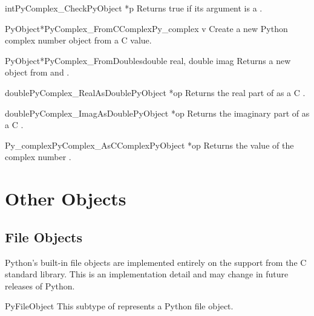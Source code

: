\documentclass{manual}
\begin{document}
\begin{cfuncdesc}{int}{PyComplex_Check}{PyObject *p}
Returns true if its argument is a .
\end{cfuncdesc}

\begin{cfuncdesc}{PyObject*}{PyComplex_FromCComplex}{Py_complex v}
Create a new Python complex number object from a C
 value.
\end{cfuncdesc}

\begin{cfuncdesc}{PyObject*}{PyComplex_FromDoubles}{double real, double imag}
Returns a new  object from  and .
\end{cfuncdesc}

\begin{cfuncdesc}{double}{PyComplex_RealAsDouble}{PyObject *op}
Returns the real part of  as a C .
\end{cfuncdesc}

\begin{cfuncdesc}{double}{PyComplex_ImagAsDouble}{PyObject *op}
Returns the imaginary part of  as a C .
\end{cfuncdesc}

\begin{cfuncdesc}{Py_complex}{PyComplex_AsCComplex}{PyObject *op}
Returns the  value of the complex number .
\end{cfuncdesc}



\section{Other Objects \label{otherObjects}}

\subsection{File Objects \label{fileObjects}}

Python's built-in file objects are implemented entirely on the
 support from the C standard library.  This is an
implementation detail and may change in future releases of Python.

\begin{ctypedesc}{PyFileObject}
This subtype of  represents a Python file object.
\end{ctypedesc}
\end{document}

